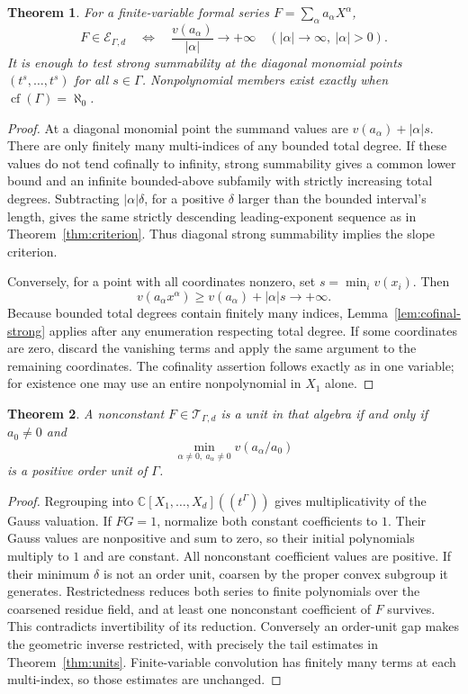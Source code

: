 \documentclass[11pt,letterpaper]{article}
\numberwithin{equation}{section}
\newtheorem{theorem}{Theorem}[section]
\theoremstyle{definition}
\theoremstyle{remark}
\newcommand{\C}{\mathbb C}
\newcommand{\cf}{\operatorname{cf}}
\begin{document}
\begin{theorem}\label{thm:multi-criterion}
For a finite-variable formal series $F=\sum_\alpha a_\alpha X^\alpha$,
\[
 F\in\mathcal E_{\Gamma,d}
 \quad\Longleftrightarrow\quad
 \frac{v(a_\alpha)}{|\alpha|}\to+\infty
 \quad(|\alpha|\to\infty,\ |\alpha|>0).
\]
It is enough to test strong summability at the diagonal monomial points
$(t^s,\ldots,t^s)$ for all $s\in\Gamma$.
Nonpolynomial members exist exactly when $\cf(\Gamma)=\aleph_0$.
\end{theorem}
\begin{proof}
At a diagonal monomial point the summand values are
$v(a_\alpha)+|\alpha|s$. There are only finitely many multi-indices of any
bounded total degree. If these values do not tend cofinally to infinity,
strong summability gives a common lower bound and an infinite bounded-above
subfamily with strictly increasing total degrees. Subtracting
$|\alpha|\delta$, for a positive $\delta$ larger than the bounded interval's
length, gives the same strictly descending leading-exponent sequence as in
Theorem~\ref{thm:criterion}. Thus diagonal strong summability implies the
slope criterion.

Conversely, for a point with all coordinates nonzero, set
$s=\min_i v(x_i)$. Then
\[
 v(a_\alpha x^\alpha)
 \ge v(a_\alpha)+|\alpha|s\to+\infty.
\]
Because bounded total degrees contain finitely many indices,
Lemma~\ref{lem:cofinal-strong} applies after any enumeration respecting
total degree. If some coordinates are zero, discard the vanishing terms
and apply the same argument to the remaining coordinates. The cofinality
assertion follows exactly as in one variable; for existence one may use an
entire nonpolynomial in $X_1$ alone.
\end{proof}

\begin{theorem}\label{thm:multi-unit}
A nonconstant $F\in\mathcal T_{\Gamma,d}$ is a unit in that algebra if and
only if $a_0\ne0$ and
\[
 \min_{\alpha\ne0,\ a_\alpha\ne0}v(a_\alpha/a_0)
\]
is a positive order unit of $\Gamma$.
\end{theorem}
\begin{proof}
Regrouping into $\C[X_1,\ldots,X_d]((t^\Gamma))$ gives multiplicativity of
the Gauss valuation. If $FG=1$, normalize both constant coefficients to $1$.
Their Gauss values are nonpositive and sum to zero, so their initial
polynomials multiply to $1$ and are constant. All nonconstant coefficient
values are positive. If their minimum $\delta$ is not an order unit,
coarsen by the proper convex subgroup it generates. Restrictedness reduces
both series to finite polynomials over the coarsened residue field, and
at least one nonconstant coefficient of $F$ survives. This contradicts
invertibility of its reduction. Conversely an order-unit gap makes the
geometric inverse restricted, with precisely the tail estimates in
Theorem~\ref{thm:units}. Finite-variable convolution has finitely many terms
at each multi-index, so those estimates are unchanged.
\end{proof}
\end{document}
